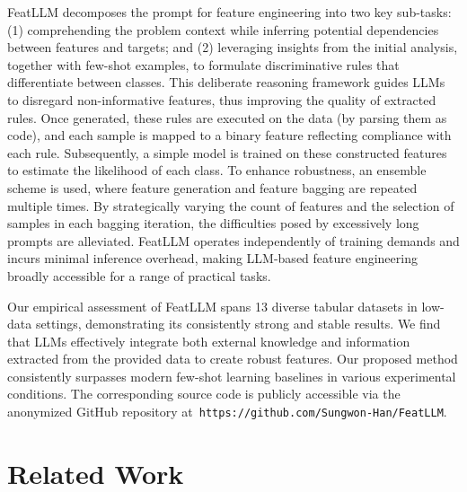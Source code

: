 \textsf{FeatLLM} decomposes the prompt for feature engineering into two key sub-tasks: (1) comprehending the problem context while inferring potential dependencies between features and targets; and (2) leveraging insights from the initial analysis, together with few-shot examples, to formulate discriminative rules that differentiate between classes. This deliberate reasoning framework guides LLMs to disregard non-informative features, thus improving the quality of extracted rules. Once generated, these rules are executed on the data (by parsing them as code), and each sample is mapped to a binary feature reflecting compliance with each rule. Subsequently, a simple model is trained on these constructed features to estimate the likelihood of each class. To enhance robustness, an ensemble scheme is used, where feature generation and feature bagging are repeated multiple times. By strategically varying the count of features and the selection of samples in each bagging iteration, the difficulties posed by excessively long prompts are alleviated. \textsf{FeatLLM} operates independently of training demands and incurs minimal inference overhead, making LLM-based feature engineering broadly accessible for a range of practical tasks.

Our empirical assessment of \textsf{FeatLLM} spans 13 diverse tabular datasets in low-data settings, demonstrating its consistently strong and stable results. We find that LLMs effectively integrate both external knowledge and information extracted from the provided data to create robust features. Our proposed method consistently surpasses modern few-shot learning baselines in various experimental conditions. The corresponding source code is publicly accessible via the anonymized GitHub repository at~\texttt{https://github.com/Sungwon-Han/FeatLLM}.

\section{Related Work}

